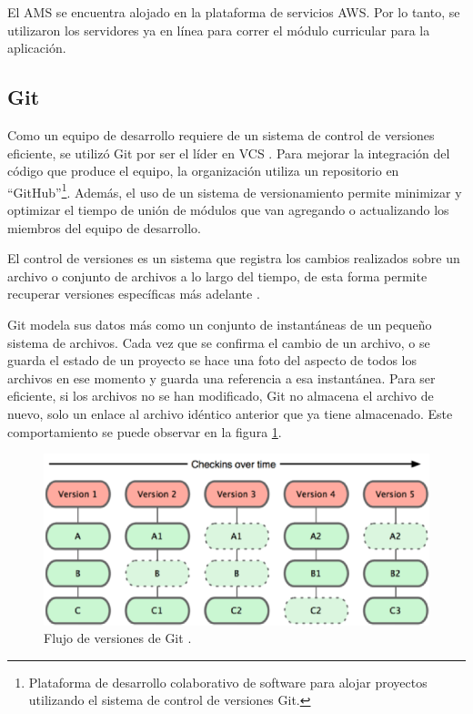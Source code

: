El AMS se encuentra alojado en la plataforma de servicios AWS. Por lo tanto, se utilizaron los servidores ya en línea para correr el módulo curricular para la aplicación.

\subsection{Git}
Como un equipo de desarrollo requiere de un sistema de control de versiones eficiente, se utilizó Git por ser el líder en VCS \citep{loeliger2012version}. Para mejorar la integración del código que produce el equipo, la organización utiliza un repositorio en \enquote{GitHub}\footnote{Plataforma de desarrollo colaborativo de software para alojar proyectos utilizando el sistema de control de versiones Git.}. Además, el uso de un sistema de versionamiento permite minimizar y optimizar el tiempo de unión de módulos que van agregando o actualizando los miembros del equipo de desarrollo.

El control de versiones es un sistema que registra los cambios realizados sobre un archivo o conjunto de archivos a lo largo del tiempo, de esta forma permite recuperar versiones específicas más adelante \citep{chacon2014pro}.

Git modela sus datos más como un conjunto de instantáneas de un pequeño sistema de archivos. Cada vez que se confirma el cambio de un archivo, o se guarda el estado de un proyecto se hace una foto del aspecto de todos los archivos en ese momento y guarda una referencia a esa instantánea. Para ser eficiente, si los archivos no se han modificado, Git no almacena el archivo de nuevo, solo un enlace al archivo idéntico anterior que ya tiene almacenado. Este comportamiento se puede observar en la figura \ref{graph_git}.

\begin{figure}[H]
\centering
\includegraphics[width=125mm,scale=1]{Figuras/tecnologias/git_over_time}
\caption{Flujo de versiones de Git \citep{chacon2014pro}.}
  \label{graph_git}
\end{figure}

